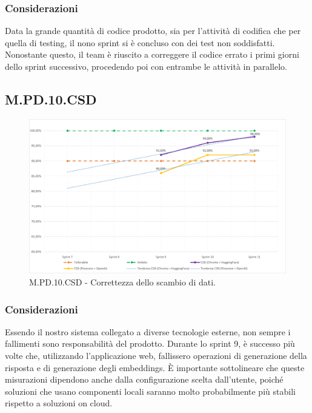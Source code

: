 \documentclass[10pt, a4paper]{article}
\begin{document}
\subsubsection{Considerazioni}
Data la grande quantità di codice prodotto, sia per l'attività di codifica che per quella di testing, il nono sprint si è concluso con dei test non soddisfatti. Nonostante questo, il team è riuscito a correggere il codice errato i primi giorni dello sprint successivo, procedendo poi con entrambe le attività in parallelo.

\subsection{M.PD.10.CSD}
\begin{figure}[H] \includegraphics[width=15.5cm]{img/metriche/MPD10CSD.png} \caption{M.PD.10.CSD - Correttezza dello scambio di dati.} \end{figure}
\subsubsection{Considerazioni}
Essendo il nostro sistema collegato a diverse tecnologie esterne, non sempre i fallimenti sono responsabilità del prodotto. Durante lo sprint 9, è successo più volte che, utilizzando l'applicazione web, fallissero operazioni di generazione della risposta e di generazione degli embeddings. È importante sottolineare che queste misurazioni dipendono anche dalla configurazione scelta dall'utente, poiché soluzioni che usano componenti locali saranno molto probabilmente più stabili rispetto a soluzioni on cloud.
\end{document}

